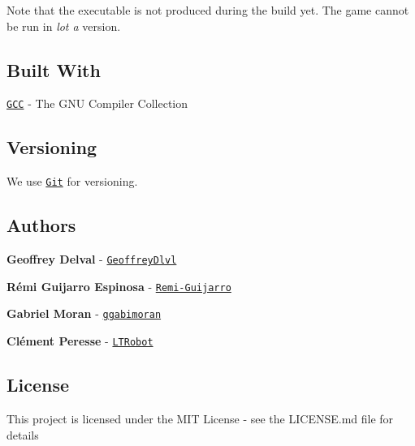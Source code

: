 Note that the executable is not produced during the build yet. The game cannot be run in {\itshape lot a} version.

\subsection*{Built With}


\begin{DoxyItemize}
\item \href{http://gcc.gnu.org}{\tt G\+CC} -\/ The G\+NU Compiler Collection
\end{DoxyItemize}

\subsection*{Versioning}

We use \href{http://git-scm.com}{\tt Git} for versioning.

\subsection*{Authors}


\begin{DoxyItemize}
\item {\bfseries Geoffrey Delval} -\/ \href{https://github.com/GeoffreyDlvl}{\tt Geoffrey\+Dlvl}
\item {\bfseries Rémi Guijarro Espinosa} -\/ \href{https://github.com/Remi-Guijarro}{\tt Remi-\/\+Guijarro}
\item {\bfseries Gabriel Moran} -\/ \href{https://github.com/ggabimoran}{\tt ggabimoran}
\item {\bfseries Clément Peresse} -\/ \href{https://github.com/LTRobot}{\tt L\+T\+Robot}
\end{DoxyItemize}

\subsection*{License}

This project is licensed under the M\+IT License -\/ see the L\+I\+C\+E\+N\+SE.md file for details 
